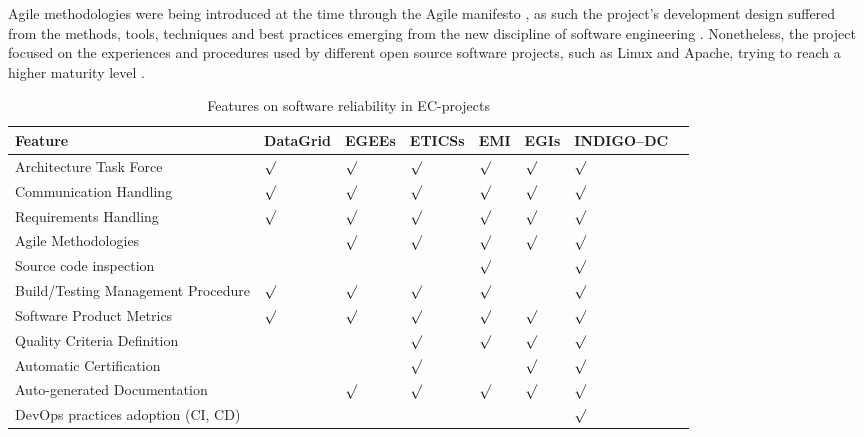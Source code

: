 \documentclass[journal]{IEEEtran}
\begin{document}
Agile methodologies were being introduced at the time
through the Agile manifesto \cite{agile-manifesto}, as such the project's
development design suffered from the methods, tools, techniques and best
practices emerging from the new discipline of software engineering
\cite{agile}. Nonetheless, the project focused on the experiences and procedures
used by different open source software projects, such as Linux and Apache, trying to reach a
higher maturity level \cite{cmm}.

\begin{table}[!h]
\renewcommand{\arraystretch}{1.3}
\caption{Features on software reliability in EC-projects}
\label{tab:feat}
\centering
\begin{adjustbox}{max width=0.5\textwidth}
\begin{tabular}{llllllll}
\hline
\hline
Feature & DataGrid & EGEEs & ETICSs & EMI & EGIs & INDIGO--DC\\
\hline
\hline
Architecture Task Force&$\surd$&$\surd$&$\surd$&$\surd$&$\surd$&$\surd$\\
Communication Handling&$\surd$&$\surd$&$\surd$&$\surd$&$\surd$&$\surd$\\
Requirements Handling&$\surd$&$\surd$&$\surd$&$\surd$&$\surd$&$\surd$\\
Agile Methodologies&&$\surd$&$\surd$&$\surd$&$\surd$&$\surd$\\
Source code inspection&&&&$\surd$&&$\surd$\\
Build/Testing Management Procedure&$\surd$&$\surd$&$\surd$&$\surd$&&$\surd$\\
Software Product Metrics&$\surd$&$\surd$&$\surd$&$\surd$&$\surd$&$\surd$\\
Quality Criteria Definition&&&$\surd$&$\surd$&$\surd$&$\surd$\\
Automatic Certification&&&$\surd$&&$\surd$&$\surd$\\
Auto-generated Documentation&&$\surd$&$\surd$&$\surd$&$\surd$&$\surd$\\
DevOps practices adoption (CI, CD)&&&&&&$\surd$\\
\hline
\hline
\end{tabular}
\end{adjustbox}
\end{table}
\end{document}
